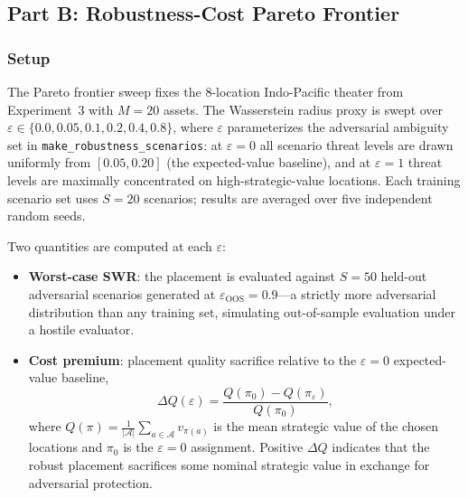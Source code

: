 \documentclass[11pt]{article}
\begin{document}
\subsection{Part B: Robustness-Cost Pareto Frontier}
\label{sec:exp4:partB}

\subsubsection{Setup}

The Pareto frontier sweep fixes the 8-location Indo-Pacific theater
from Experiment~3 with $M = 20$ assets.  The Wasserstein radius proxy
is swept over $\varepsilon \in \{0.0, 0.05, 0.1, 0.2, 0.4, 0.8\}$,
where $\varepsilon$ parameterizes the adversarial ambiguity set in
\texttt{make\_robustness\_scenarios}: at $\varepsilon = 0$ all scenario
threat levels are drawn uniformly from $[0.05, 0.20]$ (the expected-value
baseline), and at $\varepsilon = 1$ threat levels are maximally concentrated
on high-strategic-value locations.  Each training scenario set uses $S = 20$
scenarios; results are averaged over five independent random seeds.

Two quantities are computed at each $\varepsilon$:

\begin{itemize}
    \item \textbf{Worst-case SWR}: the placement is evaluated against $S = 50$
          held-out adversarial scenarios generated at $\varepsilon_{\mathrm{OOS}}
          = 0.9$---a strictly more adversarial distribution than any training
          set, simulating out-of-sample evaluation under a hostile evaluator.
    \item \textbf{Cost premium}: placement quality sacrifice relative to the
          $\varepsilon = 0$ expected-value baseline,
          \begin{equation}
              \Delta Q(\varepsilon) = \frac{Q(\pi_0) - Q(\pi_\varepsilon)}
                                          {Q(\pi_0)},
              \label{eq:cost_premium}
          \end{equation}
          where $Q(\pi) = \frac{1}{|\mathcal{A}|}\sum_{a \in \mathcal{A}}
          v_{\pi(a)}$ is the mean strategic value of the chosen locations
          and $\pi_0$ is the $\varepsilon = 0$ assignment.
          Positive $\Delta Q$ indicates that the robust placement
          sacrifices some nominal strategic value in exchange for
          adversarial protection.
\end{itemize}
\end{document}
